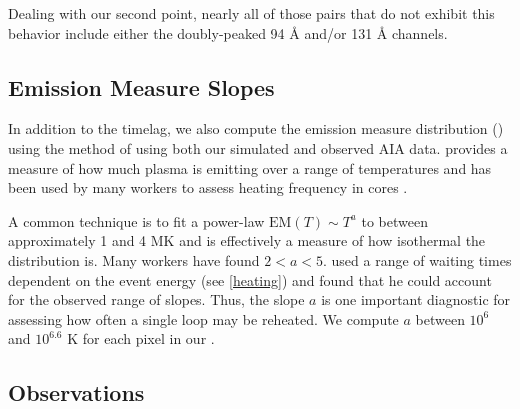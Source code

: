 Dealing with our second point, nearly all of those pairs that do not exhibit this behavior include either the doubly-peaked 94 \AA{} and/or 131 \AA{} channels. 




\subsection{Emission Measure Slopes}

In addition to the timelag, we also compute the emission measure distribution (\dem) using the method of \citet{hannah_differential_2012} using both our simulated and observed AIA data. \dem provides a measure of how much plasma is emitting over a range of temperatures and has been used by many workers to assess heating frequency in \AR{} cores \citep[][and references therein]{tripathi_emission_2011,warren_constraints_2011,warren_systematic_2012,schmelz_cold_2012,bradshaw_diagnosing_2012,reep_diagnosing_2013,barnes_inference_2016,barnes_inference_2016,barnes_inference_2016-1}. 

A common technique is to fit a power-law $\mathrm{EM}(T)\sim T^a$ to \dem between approximately 1 and 4 MK and is effectively a measure of how isothermal the distribution is. Many workers \citep[see Table 3 of][and references therein]{bradshaw_diagnosing_2012} have found $2<a<5$. \citet{cargill_active_2014} used a range of waiting times dependent on the event energy (see \autoref{heating}) and found that he could account for the observed range of slopes. Thus, the \dem slope $a$ is one important diagnostic for assessing how often a single loop may be reheated. We compute $a$ between $10^6$ and $10^{6.6}$ K for each pixel in our \AR{}.


\subsection{Observations}\label{observations}

